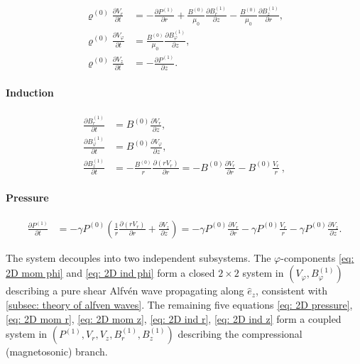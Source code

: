 \begin{align}
    \varrho^{(0)}\frac{\partial V_r}{\partial t} &= -\frac{\partial P^{(1)}}{\partial r}
        + \frac{B^{(0)}}{\mu_0}\frac{\partial B_r^{(1)}}{\partial z}
        - \frac{B^{(0)}}{\mu_0}\frac{\partial B_z^{(1)}}{\partial r},
    \label{eq: 2D mom r} \\
    \varrho^{(0)}\frac{\partial V_\varphi}{\partial t} &=
        \frac{B^{(0)}}{\mu_0}\frac{\partial B_\varphi^{(1)}}{\partial z},
    \label{eq: 2D mom phi} \\
    \varrho^{(0)}\frac{\partial V_z}{\partial t} &= -\frac{\partial P^{(1)}}{\partial z}.
    \label{eq: 2D mom z}
\end{align}

\paragraph{Induction}

\begin{align}
    \frac{\partial B_r^{(1)}}{\partial t} &=
        B^{(0)}\frac{\partial V_r}{\partial z} ,
    \label{eq: 2D ind r} \\
    \frac{\partial B_\varphi^{(1)}}{\partial t} &=
        B^{(0)}\frac{\partial V_\varphi}{\partial z},
    \label{eq: 2D ind phi} \\
    \frac{\partial B_z^{(1)}}{\partial t} &=
        -\frac{B^{(0)}}{r}\frac{\partial(r V_r)}{\partial r}
        = 
        -B^{(0)}\frac{\partial V_r}{\partial r}
        -B^{(0)}\frac{V_r}{r}  \, ,
    \label{eq: 2D ind z}
\end{align}

\paragraph{Pressure}
\begin{align}
    \frac{\partial P^{(1)}}{\partial t} &= -\gamma P^{(0)}
        \left(\frac{1}{r}\frac{\partial(r V_r)}{\partial r}
        + \frac{\partial V_z}{\partial z}\right)
        = -\gamma P^{(0)} \frac{\partial V_r}{\partial r}
        -\gamma P^{(0)} \frac{V_r}{r}
        -\gamma P^{(0)} \frac{\partial V_z}{\partial z}.
    \label{eq: 2D pressure}
\end{align}

The system decouples into two independent subsystems. The $\varphi$-components
\eqref{eq: 2D mom phi} and \eqref{eq: 2D ind phi} form a closed $2\times 2$ system
in $(V_\varphi, B_\varphi^{(1)})$ describing a pure shear Alfv\'{e}n wave
propagating along $\hat{e}_z$, consistent with \autoref{subsec: theory of alfven waves}.
The remaining five equations
\eqref{eq: 2D pressure}, \eqref{eq: 2D mom r}, \eqref{eq: 2D mom z},
\eqref{eq: 2D ind r}, \eqref{eq: 2D ind z} form a coupled system in
$(P^{(1)}, V_r, V_z, B_r^{(1)}, B_z^{(1)})$ describing the compressional
(magnetosonic) branch.

